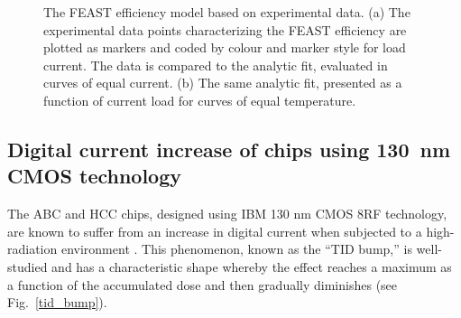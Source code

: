 \begin{figure}[ht]
\centering
{}\quad\quad
{}
\caption{The FEAST efficiency model based on experimental data. (a) The experimental data points
characterizing the FEAST efficiency are plotted as markers and coded by colour and marker style for load current. The data is
compared to the analytic fit, evaluated in curves of equal current. (b) The same analytic fit,
presented as a function of current load for curves of equal temperature.
}
\label{fig:feast_eff}
\end{figure}


\subsection{Digital current increase of chips using 130~nm CMOS technology}
\label{sec:tid_explanation}

The ABC and HCC chips, designed using IBM 130 nm CMOS 8RF technology, are known to suffer from an
increase in digital current when subjected to a high-radiation environment
\cite{Collaboration:2017mtb}. This phenomenon, known as the ``TID bump,'' is well-studied
\cite{1589217,FACCIO20081000} and has a characteristic shape whereby the effect reaches a maximum
as a function of the accumulated dose and then gradually diminishes (see Fig.~\ref{tid_bump}).

